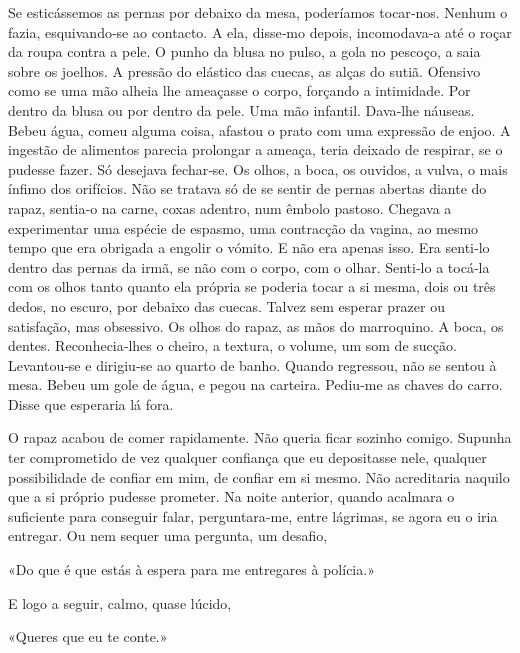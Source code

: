 Se esticássemos as pernas por debaixo da mesa, poderíamos tocar­‑nos.
Nenhum o fazia, esquivando­‑se ao contacto. A ela, disse­‑mo depois,
incomodava­‑a até o roçar da roupa contra a pele. O punho da blusa no
pulso, a gola no pescoço, a saia sobre os joelhos. A pressão do elástico
das cuecas, as alças do sutiã. Ofensivo como se uma mão alheia lhe
ameaçasse o corpo, forçando a intimidade. Por dentro da blusa ou por
dentro da pele. Uma mão infantil. Dava­‑lhe náuseas. Bebeu água, comeu
alguma coisa, afastou o prato com uma expressão de enjoo. A ingestão de
alimentos parecia prolongar a ameaça, teria deixado de respirar, se o
pudesse fazer. Só desejava fechar­‑se. Os olhos, a boca, os ouvidos, a
vulva, o mais ínfimo dos orifícios. Não se tratava só de se sentir de
pernas abertas diante do rapaz, sentia­‑o na carne, coxas adentro, num
êmbolo pastoso. Chegava a experimentar uma espécie de espasmo, uma
contracção da vagina, ao mesmo tempo que era obrigada a engolir o
vómito. E não era apenas isso. Era senti­‑lo dentro das pernas da irmã,
se não com o corpo, com o olhar. Senti­‑lo a tocá­‑la com os olhos tanto
quanto ela própria se poderia tocar a si mesma, dois ou três dedos, no
escuro, por debaixo das cuecas. Talvez sem esperar prazer ou satisfação,
mas obsessivo. Os olhos do rapaz, as mãos do marroquino. A boca, os
dentes. Reconhecia­‑lhes o cheiro, a textura, o volume, um som de
sucção. Levantou­‑se e dirigiu­‑se ao quarto de banho. Quando regressou,
não se sentou à mesa. Bebeu um gole de água, e pegou na carteira.
Pediu­‑me as chaves do carro. Disse que esperaria lá fora.

O rapaz acabou de comer rapidamente. Não queria ficar sozinho comigo.
Supunha ter comprometido de vez qualquer confiança que eu depositasse
nele, qualquer possibilidade de confiar em mim, de confiar em si mesmo.
Não acreditaria naquilo que a si próprio pudesse prometer. Na noite
anterior, quando acalmara o suficiente para conseguir falar,
perguntara­‑me, entre lágrimas, se agora eu o iria entregar. Ou nem
sequer uma pergunta, um desafio,

«Do que é que estás à espera para me entregares à polícia.»

E logo a seguir, calmo, quase lúcido,

«Queres que eu te conte.»

